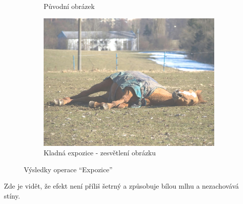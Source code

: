 \documentclass[11pt, a4paper, titlepage]{article}
\renewcommand{\uv}[1]{``#1''}
\begin{document}
\begin{figure}[h]
\begin{subfigure}[t]{0.25\textwidth}
        \caption{Původní obrázek}
    \end{subfigure}
    \hspace{1cm}
    \begin{subfigure}[t]{0.25\textwidth}
        \vskip 0pt
        \includegraphics[width=1.0\textwidth]{horse_exposure_plus.jpg}
        \caption{Kladná expozice - zesvětlení obrázku}
    \end{subfigure}
    \caption{Výsledky operace \uv{Expozice}}
    \label{fig:exposure}
\end{figure}
Zde je vidět, že efekt není příliš šetrný a způsobuje bílou mlhu a nezachovává stíny.
\end{document}
